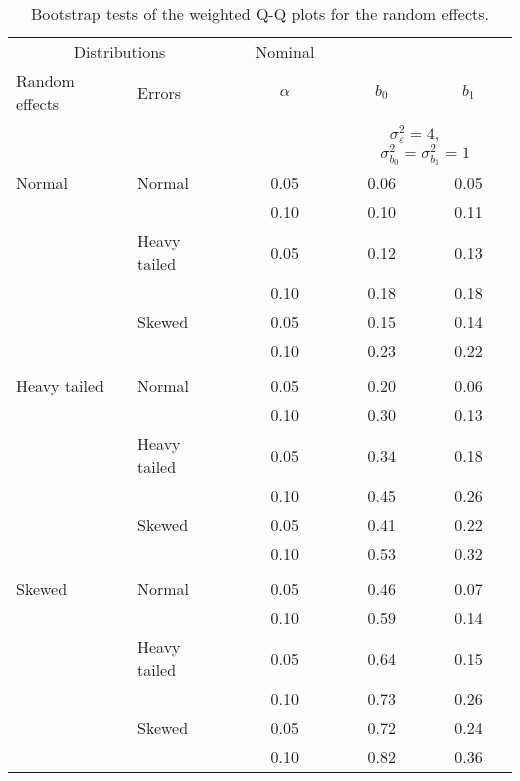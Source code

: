 

\begin{table}[ht]
\centering
\caption{\label{tab:langeryan}Bootstrap tests of the weighted Q-Q plots for the random effects.}
\begin{scriptsize}
\begin{tabular}{ll p{.1cm} c p{.1cm} cc}
  \hline
  \multicolumn{2}{c}{Distributions} & & Nominal & & & \\ \cline{1-2}
  Random effects & Errors && $\alpha$ && $b_0$ & $b_1$ \\ 
  \hline
  & && && \multicolumn{2}{c}{$\sigma_{\varepsilon}^2 = 4$, \ \ $\sigma_{b_0}^2 = \sigma_{b_1}^2 = 1$} \\ \cline{6-7}
\rowcolor{gray!20}Normal       & Normal       && 0.05 &&  0.06 & 0.05 \\ 
\rowcolor{gray!20}             &              && 0.10 &&  0.10 & 0.11 \\ 
\rowcolor{gray!20}             & Heavy tailed && 0.05 &&  0.12 & 0.13 \\ 
\rowcolor{gray!20}             &              && 0.10 &&  0.18 & 0.18 \\ 
\rowcolor{gray!20}             & Skewed       && 0.05 &&  0.15 & 0.14 \\ 
\rowcolor{gray!20}             &              && 0.10 &&  0.23 & 0.22 \\ 
             &&&&&&\\
Heavy tailed & Normal       && 0.05 &&  0.20 & 0.06 \\ 
             &              && 0.10 &&  0.30 & 0.13 \\ 
             & Heavy tailed && 0.05 &&  0.34 & 0.18 \\ 
             &              && 0.10 &&  0.45 & 0.26 \\ 
             & Skewed       && 0.05 &&  0.41 & 0.22 \\ 
             &              && 0.10 &&  0.53 & 0.32 \\ 
             &&&&&&\\
Skewed       & Normal       && 0.05 &&  0.46 & 0.07 \\ 
             &              && 0.10 &&  0.59 & 0.14 \\ 
             & Heavy tailed && 0.05 &&  0.64 & 0.15 \\ 
             &              && 0.10 &&  0.73 & 0.26 \\ 
             & Skewed       && 0.05 &&  0.72 & 0.24 \\ 
             &              && 0.10 &&  0.82 & 0.36 \\


\end{tabular}
\end{scriptsize}
\end{table}
